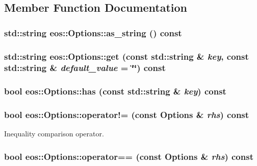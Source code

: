 \subsection{Member Function Documentation}
\hypertarget{classeos_1_1Options_a1660f95dc9e5c8859783db04d5093442}{
\subsubsection[{as\_\-string}]{\setlength{\rightskip}{0pt plus 5cm}std::string eos::Options::as\_\-string () const}}
\label{classeos_1_1Options_a1660f95dc9e5c8859783db04d5093442}
\hypertarget{classeos_1_1Options_a1f4e5296ad8f5135861334ce4969c4e4}{
\subsubsection[{get}]{\setlength{\rightskip}{0pt plus 5cm}std::string eos::Options::get (const std::string \& {\em key}, \/  const std::string \& {\em default\_\-value} = {\ttfamily \char`\"{}\char`\"{}}) const}}
\label{classeos_1_1Options_a1f4e5296ad8f5135861334ce4969c4e4}
\hypertarget{classeos_1_1Options_a84ce27abf490cf39fa5a4d1cbb835c8e}{
\subsubsection[{has}]{\setlength{\rightskip}{0pt plus 5cm}bool eos::Options::has (const std::string \& {\em key}) const}}
\label{classeos_1_1Options_a84ce27abf490cf39fa5a4d1cbb835c8e}
\hypertarget{classeos_1_1Options_aaf02fdcc1fb86da35155d85e8f3982c5}{
\subsubsection[{operator!=}]{\setlength{\rightskip}{0pt plus 5cm}bool eos::Options::operator!= (const {\bf Options} \& {\em rhs}) const}}
\label{classeos_1_1Options_aaf02fdcc1fb86da35155d85e8f3982c5}


Inequality comparison operator. \hypertarget{classeos_1_1Options_aa5defab8e8ba2e07871b20374c3f2db2}{
\subsubsection[{operator==}]{\setlength{\rightskip}{0pt plus 5cm}bool eos::Options::operator== (const {\bf Options} \& {\em rhs}) const}}
\label{classeos_1_1Options_aa5defab8e8ba2e07871b20374c3f2db2}


